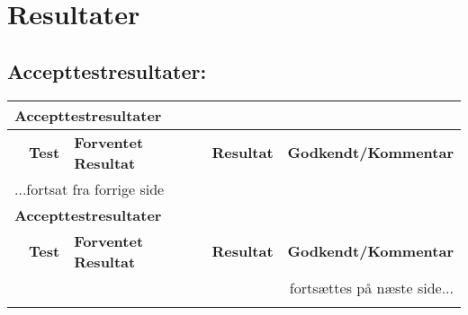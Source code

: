 \chapter{Resultater}

\section{Accepttestresultater: }

\begin{center} \centering
    \begin{longtable}{|p{}|p{}|p{}|p{}|p{}|}
    \hline
        \multicolumn{5}{|l|}{\textbf{Accepttestresultater }} \\ \hline
        \multicolumn{1}{|c|}{} &
        \textbf{Test} &
        \textbf{Forventet \newline Resultat} &
        \textbf{Resultat} &
        \textbf{Godkendt\slash \newline Kommentar} \\ \hline 
        \endfirsthead

        \multicolumn{5}{l}{...fortsat fra forrige side} \\ \hline 
        \multicolumn{5}{|l|}{\textbf{Accepttestresultater }} \\ \hline
        \multicolumn{1}{|c|}{} &
        \textbf{Test} &
        \textbf{Forventet \newline Resultat} &
        \textbf{Resultat} &
        \textbf{Godkendt\slash \newline Kommentar} \\ \hline 
        \endhead

        \multicolumn{5}{r}{fortsættes på næste side...} \\
        \endfoot
        \endlastfoot
        

\end{longtable}
\end{center}
